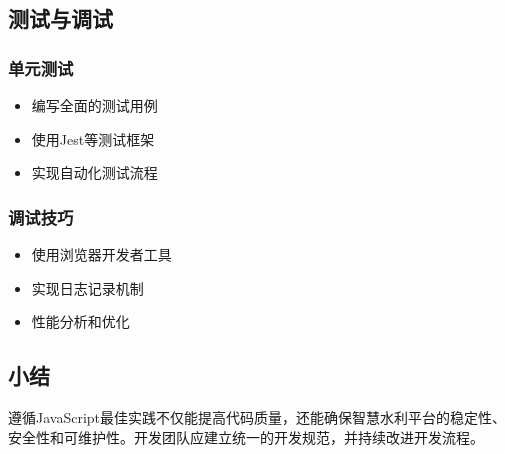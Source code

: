 \subsection{测试与调试}\label{ux6d4bux8bd5ux4e0eux8c03ux8bd5}

\subsubsection{单元测试}\label{ux5355ux5143ux6d4bux8bd5}

\begin{itemize}
\tightlist
\item
  编写全面的测试用例
\item
  使用Jest等测试框架
\item
  实现自动化测试流程
\end{itemize}

\subsubsection{调试技巧}\label{ux8c03ux8bd5ux6280ux5de7}

\begin{itemize}
\tightlist
\item
  使用浏览器开发者工具
\item
  实现日志记录机制
\item
  性能分析和优化
\end{itemize}

\subsection{小结}\label{ux5c0fux7ed3}

遵循JavaScript最佳实践不仅能提高代码质量，还能确保智慧水利平台的稳定性、安全性和可维护性。开发团队应建立统一的开发规范，并持续改进开发流程。

